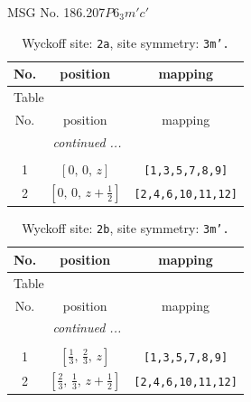 \documentclass[fleqn,8pt]{jsarticle}
\begin{document}
\setcounter{MaxMatrixCols}{32}

\renewcommand{\tablename}{Table~}
\renewcommand{\figurename}{Figure~}
\begin{center}
\LARGE
MSG No. 186.207\quad$P6_{3}m'c'$
\end{center}
\renewcommand{\arraystretch}{1.2}
\begin{longtable}{ccc}
\caption{Wyckoff site: {\tt 2a}, site symmetry: {\tt 3m'.}}
 \\
 \hline \hline
No. & position & mapping \\ \hline \endfirsthead

\multicolumn{2}{l}{\tablename\ \thetable{}} \\
 \hline \hline
No. & position & mapping \\ \hline \endhead

 \hline \hline
\multicolumn{2}{r}{\footnotesize\it continued ...} \\ \endfoot

 \hline \hline
\multicolumn{2}{r}{} \\ \endlastfoot

1 & $\left[ 0,\, 0,\, z \right]$ & {\tt [1,3,5,7,8,9]} \\ \hline
2 & $\left[ 0,\, 0,\, z + \frac{1}{2} \right]$ & {\tt [2,4,6,10,11,12]} \\
\end{longtable}
\renewcommand{\arraystretch}{1.2}
\begin{longtable}{ccc}
\caption{Wyckoff site: {\tt 2b}, site symmetry: {\tt 3m'.}}
 \\
 \hline \hline
No. & position & mapping \\ \hline \endfirsthead

\multicolumn{2}{l}{\tablename\ \thetable{}} \\
 \hline \hline
No. & position & mapping \\ \hline \endhead

 \hline \hline
\multicolumn{2}{r}{\footnotesize\it continued ...} \\ \endfoot

 \hline \hline
\multicolumn{2}{r}{} \\ \endlastfoot

1 & $\left[ \frac{1}{3},\, \frac{2}{3},\, z \right]$ & {\tt [1,3,5,7,8,9]} \\ \hline
2 & $\left[ \frac{2}{3},\, \frac{1}{3},\, z + \frac{1}{2} \right]$ & {\tt [2,4,6,10,11,12]} \\
\end{longtable}
\end{document}
